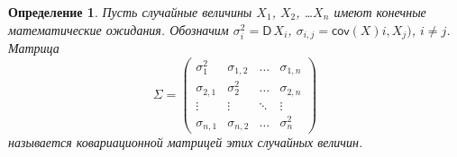 \documentclass[12pt]{article}
\newtheorem{definition}{Определение}
\newcommand{\cov}{\mathsf{cov}}
\newcommand{\var}{\mathsf{D}\,}
\begin{document}
\begin{definition}
  Пусть случайные величины  $X_1$, $X_2$, \ldots $X_n$ имеют конечные математические
  ожидания. Обозначим $\sigma_i^2=\var X_i$, $\sigma_{i,j}=\cov(X)i, X_j)$, $i\neq
  j$. Матрица 
  \[
  \Sigma=
  \begin{pmatrix}
    \sigma_1^2 & \sigma_{1,2} & \ldots & \sigma_{1,n}\\
    \sigma_{2,1} & \sigma_{2}^2 & \ldots & \sigma_{2,n}\\
    \vdots & \vdots & \ddots & \vdots\\
    \sigma_{n,1} & \sigma_{n,2} & \ldots & \sigma_n^2
  \end{pmatrix}
  \]
  называется \emph{ковариационной матрицей} этих случайных величин.
\end{definition}
\end{document}
